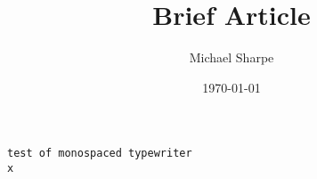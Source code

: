 \documentclass[10pt]{amsart}
\title{Brief Article}
\author{Michael Sharpe}
\date{\today}  %
\begin{document}
\maketitle
{\tt test of monospaced typewriter}\\
\hbox{\tt x}\showthe{}
\end{document}
